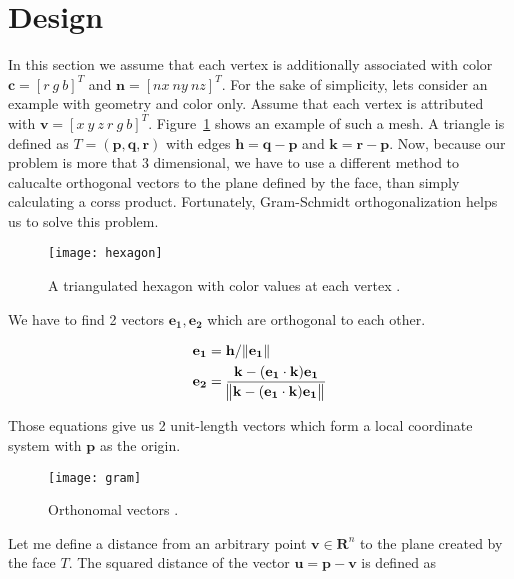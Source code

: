 \section{Design}
In this section we assume that each vertex is additionally associated with color $\mathbf{c} = [r \ g \ b]^T$ and $\mathbf{n} = [nx \ ny \ nz]^T$. For the sake of simplicity, lets consider an example with geometry and color only. Assume that each vertex is attributed with $\mathbf{v} = [x \ y \ z \ r \ g \ b]^T$. Figure~\ref{fig:hexagon} shows an example of such a mesh. A triangle is defined as $T = (\mathbf{p}, \mathbf{q}, \mathbf{r})$ with edges $\mathbf{h} = \mathbf{q} - \mathbf{p}$ and $\mathbf{k} = \mathbf{r} - \mathbf{p}$. Now, because our problem is more that 3 dimensional, we have to use a different method to calucalte orthogonal vectors to the plane defined by the face, than simply calculating a corss product. Fortunately, Gram-Schmidt orthogonalization \cite{strang88} helps us to solve this problem.

\begin{figure}[H]
  \begin{center}
    \texttt{[image: hexagon]}
    \caption{A triangulated hexagon with color values at each vertex \cite{garland99}.}
    \label{fig:hexagon}
  \end{center}
\end{figure}

We have to find 2 vectors $\mathbf{e_1}, \mathbf{e_2}$ which are orthogonal to each other.

\begin{align}
\mathbf{e_1} &= \mathbf{h} / \norm{\mathbf{e_1}} \\
\mathbf{e_2} &= \frac{\mathbf{k} - (\mathbf{e_1} \cdot \mathbf{k})\mathbf{e_1}}{\norm{\mathbf{k} - (\mathbf{e_1} \cdot \mathbf{k})\mathbf{e_1}}}
\end{align}

Those equations give us 2 unit-length vectors which form a local coordinate system with $\mathbf{p}$ as the origin.

\begin{figure}[H]
  \begin{center}
    \texttt{[image: gram]}
    \caption{Orthonomal vectors \cite{garland99}.}
    \label{fig:gram}
  \end{center}
\end{figure}

Let me define a distance from an arbitrary point $\mathbf{v}\in\mathbf{R}^n$ to the plane created by the face $T$. The squared distance of the vector $\mathbf{u} = \mathbf{p} - \mathbf{v}$ is defined as \cite{garland99}

